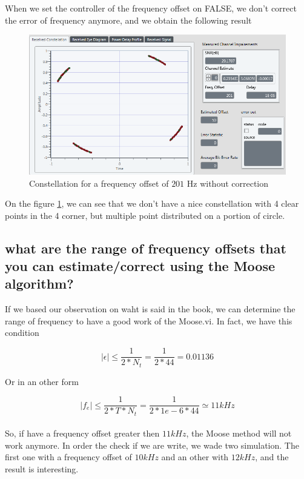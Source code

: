 \documentclass[frenchb, oneside, headings=normal]{scrartcl}
\begin{document}
When we set the controller of the frequency offset on FALSE, we don't correct the error of frequency anymore, and we obtain the following result

\begin{figure}[!ht]
\centering
\includegraphics[scale=0.7]{img/test_offset_201hz_OFF.PNG}
\caption{Constellation for a frequency offset of $201$ Hz without correction}
\label{freq_correct_off}
\end{figure}

On the figure \ref{freq_correct_off}, we can see  that we don't have a nice constellation with 4 clear points in the 4 corner, but multiple point distributed on a portion of circle. 


\newpage

\subsection{what are the range of frequency offsets that you can estimate/correct using the Moose algorithm?}

If we based our observation on waht is said in the book, we can determine the range of frequency to have a good work of the Moose.vi. In fact, we have this condition

\begin{equation}
|\epsilon| \leq \frac{1}{2*N_t} = \frac{1}{2*44} = 0.01136
\end{equation}

Or in an other form 

\begin{equation}
|f_e| \leq \frac{1}{2*T*N_t} = \frac{1}{2*1e-6*44} \simeq 11 kHz
\end{equation}\\

So, if have a frequency offset greater then $11 kHz$, the Moose method will not work anymore. In order the check if we are write, we wade two simulation. The first one with a frequency offset of $10 kHz$ and an other with $12 kHz$, and the result is interesting.\\
\end{document}
